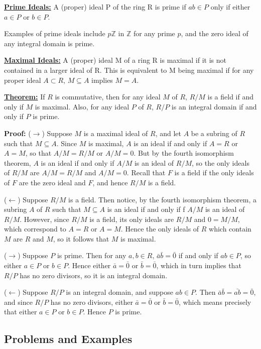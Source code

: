 \documentclass{article}
\begin{document}
\noindent \textbf{\underline{Prime Ideals:}} A (proper) ideal P of the ring R is prime if $ab\in P$ only if either $a\in P$ or $b\in P$.


Examples of prime ideals include $p\mathbb{Z}$ in $\mathbb{Z}$ for any prime $p$, and the zero ideal of any integral domain is prime.

\noindent \textbf{\underline{Maximal Ideals:}} A (proper) ideal M of a ring R is maximal if it is not contained in a larger ideal of R. This is equivalent to M being maximal if for any proper ideal $A\subset R$, $M\subseteq A$ implies $M=A$.

\noindent \textbf{\underline{Theorem:}} If $R$ is commutative, then for any ideal $M$ of $R$, $R/M$ is a field if and only if $M$ is maximal. Also, for any ideal $P$ of $R$, $R/P$ is an integral domain if and only if $P$ is prime.

\noindent \textbf{Proof:}
($\rightarrow$)
Suppose $M$ is a maximal ideal of $R$, and let $A$ be a subring of $R$ such that $M\subseteq A$. Since $M$ is maximal, $A$ is an ideal if and only if $A=R$ or $A=M$, so that $A/M = R/M$ or $A/M = 0$. But by the fourth isomorphism theorem, $A$ is an ideal if and only if $A/M$ is an ideal of $R/M$, so the only ideals of $R/M$ are $A/M = R/M$ and $A/M = 0$. Recall that $F$ is a field if the only ideals of $F$ are the zero ideal and $F$, and hence $R/M$ is a field.

\noindent ($\leftarrow$) Suppose $R/M$ is a field. Then notice, by the fourth isomorphism theorem, a subring $A$ of $R$ such that $M\subseteq A$ is an ideal if and only if f $A/M$ is an ideal of $R/M$. However, since $R/M$ is a field, its only ideals are $R/M$ and $0 = M/M$, which correspond to $A=R$ or $A=M$. Hence the only ideals of $R$ which contain $M$ are $R$ and $M$, so it follows that $M$ is maximal. 

\noindent ($\rightarrow$) Suppose $P$ is prime. Then for any $a,b\in R$, $\bar{a}\bar{b}=\bar{0}$ if and only if $ab\in P$, so either $a\in P$ or $b\in P$. Hence either $\bar{a}=\bar{0}$ or $\bar{b}=\bar{0}$, which in turn implies that $R/P$ has no zero divisors, so it is an integral domain.

\noindent ($\leftarrow$) Suppose $R/P$ is an integral domain, and suppose $ab\in P$. Then $\bar{a}\bar{b}=\bar{ab}=\bar{0}$, and since $R/P$ has no zero divisors, either $\bar{a}=\bar{0}$ or $\bar{b}=\bar{0}$, which means precisely that either $a\in P$ or $b\in P$. Hence $P$ is prime.

\subsection{Problems and Examples}
\end{document}
